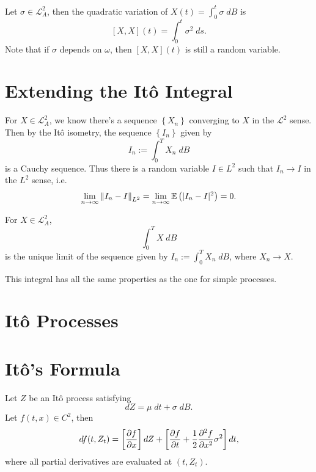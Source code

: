 \documentclass[twoside,10pt]{report}
\begin{document}

\begin{prop}
Let $\sigma \in \mathcal{L}_{A}^2$, then the quadratic variation of $X(t) = \int_{0}^{t} \sigma\;dB$ is
\[
[X,X](t) = \int_{0}^{t} \sigma^{2}\;ds.
\] 
Note that if $\sigma$ depends on $\omega$, then $[X,X](t)$ is still a random variable.
\end{prop}

\section{Extending the It\^o Integral}

For $X \in \mathcal{L}_{A}^2$, we know there's a sequence $ \left\{ X_{n} \right\}$ converging to $X$ in the $\mathcal{L}^2$ sense. Then by the It\^o isometry, the sequence $\left\{ I_{n} \right\}$ given by
\[
I_{n} := \int_{0}^{T} X_{n}\;dB
\] is a Cauchy sequence. Thus there is a random variable $I \in L^2$ such that $I_{n}\to I$ in the $L^2$ sense, i.e.
\[
\lim_{n \to \infty} {\Vert{I_{n}-I}\Vert}_{L^2} = \lim_{n \to \infty} \mathbb{E} \left(  |I_{n}-I|^2  \right) = 0.
\] 
\begin{defn}[]
For $X \in \mathcal{L}_{A}^2$,
\[
\int_{0}^{T} X\;dB
\] is the unique limit of the sequence given by $I_{n} := \int_{0}^{T} X_{n}\;dB$, where $X_{n} \to X$.
\end{defn}

This integral has all the same properties as the one for simple processes.

\section{It\^o Processes}


\section{It\^o's Formula}

\begin{thrm}[]
	Let $Z$ be an It\^o process satisfying
	\[
	dZ = \mu\;dt + \sigma\;dB.
	\] Let $f(t,x) \in C^2$, then
	\[
	df(t, Z_{t}) = \left[ \frac{\partial f}{\partial x} \right]dZ + \left[ \frac{\partial f}{\partial t} + \frac{1}{2} \frac{\partial^2 f}{\partial x^2} \sigma^{2} \right]dt,
	\] 
	where all partial derivatives are evaluated at $(t,Z_{t})$.
\end{thrm}
\end{document}
